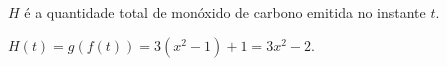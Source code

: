 $H$ é a quantidade total de monóxido de carbono emitida no instante $t$.

$H(t)=g(f(t))=3(x^2-1)+1=3x^2-2.$
